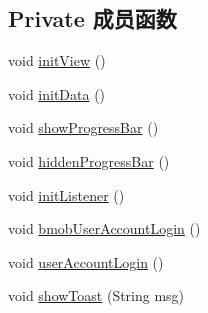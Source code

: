 \subsection*{Private 成员函数}
\begin{DoxyCompactItemize}
\item 
void \mbox{\hyperlink{classcom_1_1example_1_1akisame__lin_1_1love__air2_1_1_login_activity_a6b1d2560bdad619edb7208c657a90ff1}{init\+View}} ()
\item 
void \mbox{\hyperlink{classcom_1_1example_1_1akisame__lin_1_1love__air2_1_1_login_activity_a597d7b4569e90ee9392b876cec621a64}{init\+Data}} ()
\item 
void \mbox{\hyperlink{classcom_1_1example_1_1akisame__lin_1_1love__air2_1_1_login_activity_a79ab2ce020abcd7c699e9ffb9fb0c0da}{show\+Progress\+Bar}} ()
\item 
void \mbox{\hyperlink{classcom_1_1example_1_1akisame__lin_1_1love__air2_1_1_login_activity_ab4b320f1a78d4b2d455e0c21f72b577d}{hidden\+Progress\+Bar}} ()
\item 
void \mbox{\hyperlink{classcom_1_1example_1_1akisame__lin_1_1love__air2_1_1_login_activity_a60140381a6346d9c02a847aa3b4060a9}{init\+Listener}} ()
\item 
void \mbox{\hyperlink{classcom_1_1example_1_1akisame__lin_1_1love__air2_1_1_login_activity_a75ccadb3cabebfc821df3c3c81aab1e0}{bmob\+User\+Account\+Login}} ()
\item 
void \mbox{\hyperlink{classcom_1_1example_1_1akisame__lin_1_1love__air2_1_1_login_activity_adedd94f9ed4268b1ec28c9d171ea8ed0}{user\+Account\+Login}} ()
\item 
void \mbox{\hyperlink{classcom_1_1example_1_1akisame__lin_1_1love__air2_1_1_login_activity_a0598830a0c9a438de6ad10b4525d97f2}{show\+Toast}} (String msg)
\end{DoxyCompactItemize}
